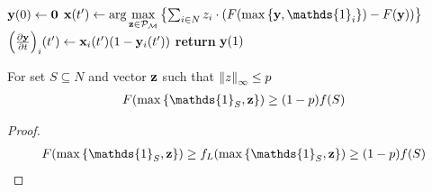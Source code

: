 
\begin{algorithm}
	\caption{}\label{alg:measured_cont_greedy}
	\begin{algorithmic}[1]
		\State $\vb{y}(0) \gets \vb{0}$
		\State $\vb{x}(t') \gets \arg \max\limits_{\vb{z} \in \mathcal{P}_\mathcal{M}} \qty{\sum_{i \in N} z_i\cdot \qty( F\qty(\max\qty{\vb{y}, \mathds{1}_i})-F(\vb{y}))} $
		\State $\qty(\pdv{\vb{y}}{t})_i\qty(t') \gets \vb{x}_i(t') \qty(1-\vb{y}_i(t'))$
		\EndFor
		\State \textbf{return} $\vb{y}(1)$
		\EndProcedure
	\end{algorithmic}
\end{algorithm}

\begin{lemma} \label{bound_random}
	For set $S\subseteq N$ and vector $\vb{z}$ such that $\norm{z}_\infty \leq p$
	\begin{align}
	F(\max\qty{\mathds{1}_S , \vb{z}}) \geq (1-p) f(S)
	\end{align}
	\begin{proof}
		\begin{align}
		F(\max\qty{\mathds{1}_S , \vb{z}}) \geq f_L(\max\qty{\mathds{1}_S , \vb{z}}) \geq (1-p)f(S)
		\end{align}
	\end{proof}
\end{lemma}

